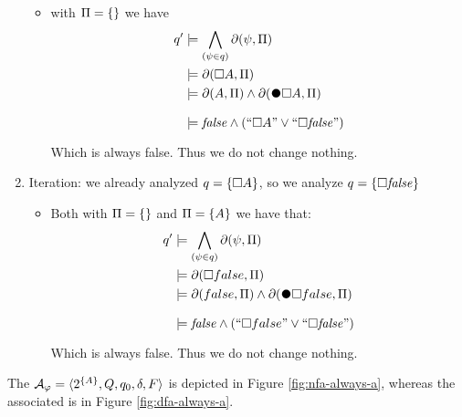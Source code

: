 \begin{example}
\begin{enumerate}
\begin{itemize}
			\item with $\Pi = \{\}$ we have 
			\begin{align*}
			q' &\models \bigwedge_{(\psi\in q)} \Dfun{\psi}\\
			&\models \Dfun{\Box A}\\
			&\models \Dfun{A} \lAND \Dfun{\Wnext \Box A}\\
			&\models \false \lAND (``\Box A" \lOR ``\Box \false")
			\end{align*}
			Which is always false. Thus we do not change nothing.
		\end{itemize}
		\item Iteration: we already analyzed $q = \{\Box A\}$, so we analyze $q = \{\Box \mathit{false}\}$
		\begin{itemize}			
			\item Both with $\Pi = \{\}$ and $\Pi = \{A\}$ we have that:
			\begin{align*}
			q' &\models \bigwedge_{(\psi\in q)} \Dfun{\psi}\\
			&\models \Dfun{\Box false}\\
			&\models \Dfun{false} \lAND \Dfun{\Wnext \Box false}\\
			&\models \false \lAND (``\Box false" \lOR ``\Box \false")
			\end{align*}
			Which is always false. Thus we do not change nothing.
		\end{itemize}
	\end{enumerate}
	
	The \NFA $\mathcal{A}_\varphi = \langle 2^{\{A\}}, Q, q_0, \delta, F \rangle$ is depicted in Figure \ref{fig:nfa-always-a}, whereas the associated \DFA is in Figure \ref{fig:dfa-always-a}.
	

\end{example}
